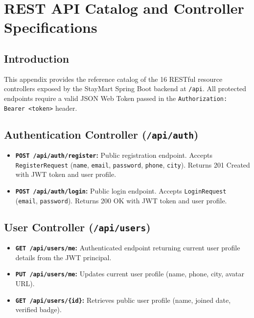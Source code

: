 \chapter{REST API Catalog and Controller Specifications}

\section{Introduction}
This appendix provides the reference catalog of the 16 RESTful resource controllers exposed by the StayMart Spring Boot backend at \texttt{/api}. All protected endpoints require a valid JSON Web Token passed in the \texttt{Authorization: Bearer <token>} header.

\section{Authentication Controller (\texttt{/api/auth})}
\begin{itemize}
    \item \textbf{\texttt{POST /api/auth/register}:} Public registration endpoint. Accepts \texttt{RegisterRequest} (\texttt{name}, \texttt{email}, \texttt{password}, \texttt{phone}, \texttt{city}). Returns 201 Created with JWT token and user profile.
    \item \textbf{\texttt{POST /api/auth/login}:} Public login endpoint. Accepts \texttt{LoginRequest} (\texttt{email}, \texttt{password}). Returns 200 OK with JWT token and user profile.
\end{itemize}

\section{User Controller (\texttt{/api/users})}
\begin{itemize}
    \item \textbf{\texttt{GET /api/users/me}:} Authenticated endpoint returning current user profile details from the JWT principal.
    \item \textbf{\texttt{PUT /api/users/me}:} Updates current user profile (name, phone, city, avatar URL).
    \item \textbf{\texttt{GET /api/users/\{id\}}:} Retrieves public user profile (name, joined date, verified badge).
\end{itemize}


